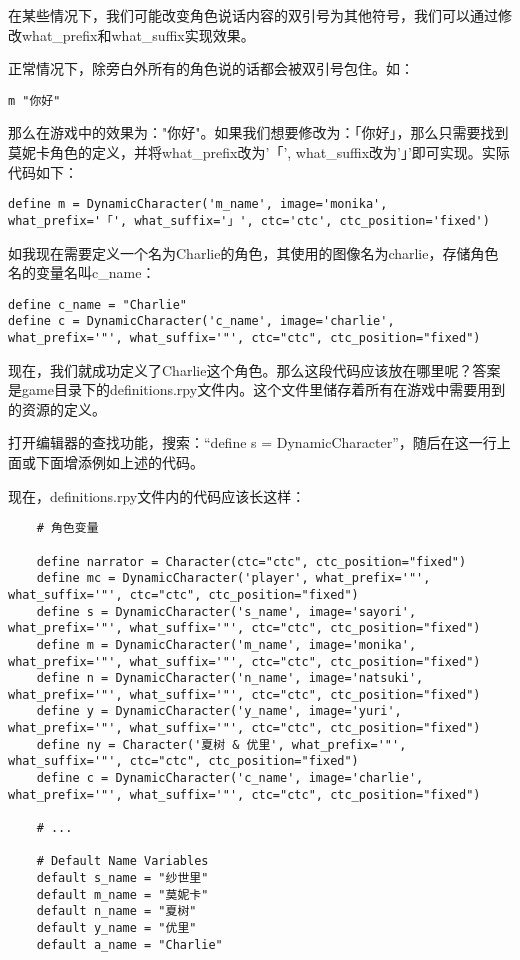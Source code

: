 \begin{ExtraKnowledge}
    在某些情况下，我们可能改变角色说话内容的双引号为其他符号，我们可以通过修改what\_prefix和what\_suffix实现效果。

    正常情况下，除旁白外所有的角色说的话都会被双引号包住。如：
    \begin{lstlisting}
m "你好"
    \end{lstlisting}

    那么在游戏中的效果为："你好"。如果我们想要修改为：「你好」，那么只需要找到莫妮卡角色的定义，并将what\_prefix改为'「', what\_suffix改为'」'即可实现。实际代码如下：
    \begin{lstlisting}
define m = DynamicCharacter('m_name', image='monika', what_prefix='「', what_suffix='」', ctc='ctc', ctc_position='fixed')
    \end{lstlisting}
\end{ExtraKnowledge}

如我现在需要定义一个名为Charlie的角色，其使用的图像名为charlie，存储角色名的变量名叫c\_name：
\begin{lstlisting}
define c_name = "Charlie"
define c = DynamicCharacter('c_name', image='charlie', what_prefix='"', what_suffix='"', ctc="ctc", ctc_position="fixed")
\end{lstlisting}

现在，我们就成功定义了Charlie这个角色。那么这段代码应该放在哪里呢？答案是game目录下的definitions.rpy文件内。这个文件里储存着所有在游戏中需要用到的资源的定义。

打开编辑器的查找功能，搜索：“define s = DynamicCharacter”，随后在这一行上面或下面增添例如上述的代码。

现在，definitions.rpy文件内的代码应该长这样：
\begin{lstlisting}
    # 角色变量

    define narrator = Character(ctc="ctc", ctc_position="fixed")
    define mc = DynamicCharacter('player', what_prefix='"', what_suffix='"', ctc="ctc", ctc_position="fixed")
    define s = DynamicCharacter('s_name', image='sayori', what_prefix='"', what_suffix='"', ctc="ctc", ctc_position="fixed")
    define m = DynamicCharacter('m_name', image='monika', what_prefix='"', what_suffix='"', ctc="ctc", ctc_position="fixed")
    define n = DynamicCharacter('n_name', image='natsuki', what_prefix='"', what_suffix='"', ctc="ctc", ctc_position="fixed")
    define y = DynamicCharacter('y_name', image='yuri', what_prefix='"', what_suffix='"', ctc="ctc", ctc_position="fixed")
    define ny = Character('夏树 & 优里', what_prefix='"', what_suffix='"', ctc="ctc", ctc_position="fixed")
    define c = DynamicCharacter('c_name', image='charlie', what_prefix='"', what_suffix='"', ctc="ctc", ctc_position="fixed")
    
    # ...
    
    # Default Name Variables
    default s_name = "纱世里"
    default m_name = "莫妮卡"
    default n_name = "夏树"
    default y_name = "优里"
    default a_name = "Charlie"
    
    
\end{lstlisting}

